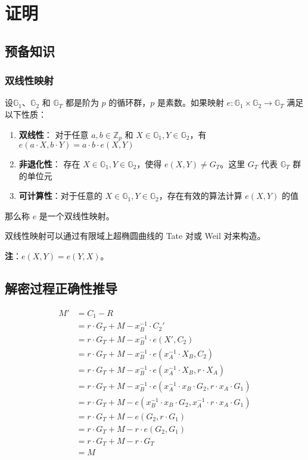\documentclass[a4paper,10pt]{article}
\newcommand{\bG}{\mathbb{G}}
\newcommand{\bZ}{\mathbb{Z}}
\begin{document}
\section{证明}
\subsection{预备知识}
\subsubsection{双线性映射}
设\(\bG_1\)、\(\bG_2\) 和 \(\bG_T\) 都是阶为 \(p\) 的循环群，\(p\) 是素数。如果映射 \(e: \bG_1\times\bG_2\rightarrow\bG_T\) 满足以下性质：

\begin{enumerate}
  \item \textbf{双线性}： 对于任意 \(a,b\in \bZ_p\) 和 \(X\in\bG_1, Y\in\bG_2\)，有 \(e(a\cdot X, b\cdot Y) = a\cdot b\cdot e(X, Y)\)
  \item \textbf{非退化性}： 存在 \(X\in\bG_1, Y\in\bG_2\)，使得 \(e(X,Y)\neq G_T\)。这里 \(G_T\) 代表 \(\bG_T\) 群的单位元
  \item \textbf{可计算性}：对于任意的 \(X\in\bG_1, Y\in\bG_2\)，存在有效的算法计算 \(e(X,Y)\) 的值
\end{enumerate}

那么称 \(e\) 是一个双线性映射。

双线性映射可以通过有限域上超椭圆曲线的 Tate 对或 Weil 对来构造。

\textbf{注}：\(e(X,Y)=e(Y,X)\)。

\subsection{解密过程正确性推导}
\begin{align*}
  M' &= C_1-R \\
     &= r\cdot G_T + M - x_B^{-1} \cdot C_2' \\
     &= r\cdot G_T + M - x_B^{-1} \cdot e(X',C_2) \\
     &= r\cdot G_T + M - x_B^{-1} \cdot e(x_A^{-1}\cdot X_B,C_2) \\
     &= r\cdot G_T + M - x_B^{-1} \cdot e(x_A^{-1}\cdot X_B,r\cdot X_A) \\
     &= r\cdot G_T + M - x_B^{-1} \cdot e(x_A^{-1}\cdot x_B \cdot G_2,r\cdot x_A\cdot G_1) \\
     &= r\cdot G_T + M - e(x_B^{-1}\cdot x_B \cdot G_2,x_A^{-1} \cdot r\cdot x_A\cdot G_1) \\
     &= r\cdot G_T + M - e(G_2,r\cdot G_1) \\
     &= r\cdot G_T + M - r\cdot e(G_2,G_1) \\
     &= r\cdot G_T + M - r\cdot G_T \\
     &= M
\end{align*}
\end{document}
